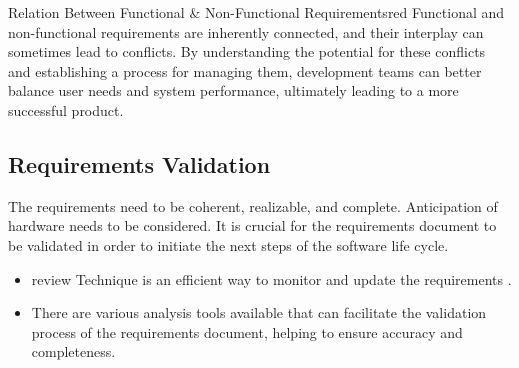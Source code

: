 \begin{prettyBox}{Relation Between Functional \& Non-Functional Requirements}{red}
 Functional and non-functional requirements are inherently connected, and their interplay can sometimes lead to conflicts. 
 By understanding the potential for these conflicts and establishing a process for managing them, development teams can better
 balance user needs and system performance, ultimately leading to a more successful product.
\end{prettyBox}

\subsection{Requirements Validation}
The requirements need to be coherent, realizable, and complete. Anticipation of hardware needs to be considered. 
It is crucial for the requirements document to be validated in order to initiate the next steps of the software life cycle.

\begin{itemize}
    \item review Technique is an efficient way to monitor and update the requirements .
    \item There are various analysis tools available that can facilitate the validation process of the requirements document,
helping to ensure accuracy and completeness.
\end{itemize}

